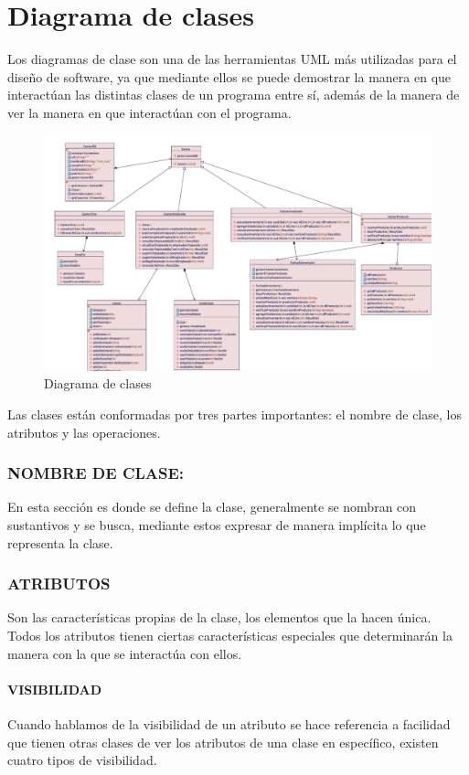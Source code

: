 \chapter{Diagrama de clases}
Los diagramas de clase son una de las herramientas UML más utilizadas para el diseño de software, ya que mediante ellos se puede demostrar la manera en que interactúan las distintas clases de un programa entre sí, además de la manera de ver la manera en que interactúan con el programa.
\begin{figure}[h!]
	\centering
	\includegraphics[scale=0.4]{diseno/clases/imgs/clases}
	\caption{Diagrama de clases}
\end{figure}
Las clases están conformadas por tres partes importantes: el nombre de clase, los atributos y las operaciones.

\subsection*{NOMBRE DE CLASE:}
En esta sección es donde se define la clase, generalmente se nombran con sustantivos y se busca, mediante estos expresar de manera implícita lo que representa la clase.
  
\subsection*{ATRIBUTOS}
Son las características propias de la clase, los elementos que la hacen única. Todos los atributos tienen ciertas características especiales que determinarán la manera con la que se interactúa con ellos.

\subsubsection*{VISIBILIDAD}
Cuando hablamos de la visibilidad de un atributo se hace referencia a facilidad que tienen otras clases de ver los atributos de una clase en específico, existen cuatro tipos de visibilidad.

